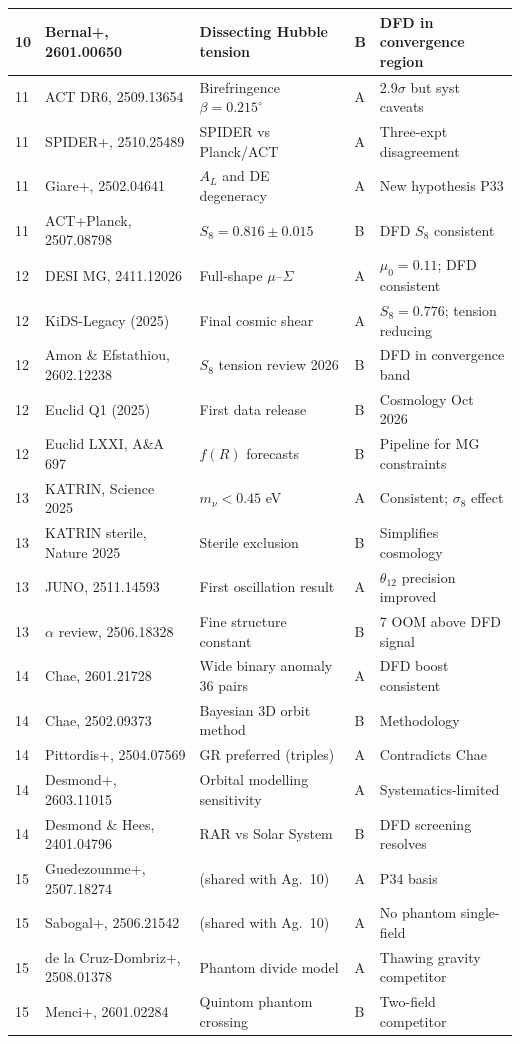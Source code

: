 \documentclass[11pt,a4paper]{article}
\begin{document}
\begin{longtable}{p{0.5cm}p{3.5cm}p{3.5cm}p{1cm}p{3.5cm}}
10 & Bernal+, 2601.00650 & Dissecting Hubble tension & B & DFD in convergence region \\
\midrule
11 & ACT DR6, 2509.13654 & Birefringence $\beta = 0.215^\circ$ & A & 2.9$\sigma$ but syst caveats \\
11 & SPIDER+, 2510.25489 & SPIDER vs Planck/ACT & A & Three-expt disagreement \\
11 & Giare+, 2502.04641 & $A_L$ and DE degeneracy & A & New hypothesis P33 \\
11 & ACT+Planck, 2507.08798 & $S_8 = 0.816 \pm 0.015$ & B & DFD $S_8$ consistent \\
\midrule
12 & DESI MG, 2411.12026 & Full-shape $\mu$--$\Sigma$ & A & $\mu_0 = 0.11$; DFD consistent \\
12 & KiDS-Legacy (2025) & Final cosmic shear & A & $S_8 = 0.776$; tension reducing \\
12 & Amon \& Efstathiou, 2602.12238 & $S_8$ tension review 2026 & B & DFD in convergence band \\
12 & Euclid Q1 (2025) & First data release & B & Cosmology Oct 2026 \\
12 & Euclid LXXI, A\&A 697 & $f(R)$ forecasts & B & Pipeline for MG constraints \\
\midrule
13 & KATRIN, Science 2025 & $m_\nu < 0.45$ eV & A & Consistent; $\sigma_8$ effect \\
13 & KATRIN sterile, Nature 2025 & Sterile exclusion & B & Simplifies cosmology \\
13 & JUNO, 2511.14593 & First oscillation result & A & $\theta_{12}$ precision improved \\
13 & $\alpha$ review, 2506.18328 & Fine structure constant & B & 7 OOM above DFD signal \\
\midrule
14 & Chae, 2601.21728 & Wide binary anomaly 36 pairs & A & DFD boost consistent \\
14 & Chae, 2502.09373 & Bayesian 3D orbit method & B & Methodology \\
14 & Pittordis+, 2504.07569 & GR preferred (triples) & A & Contradicts Chae \\
14 & Desmond+, 2603.11015 & Orbital modelling sensitivity & A & Systematics-limited \\
14 & Desmond \& Hees, 2401.04796 & RAR vs Solar System & B & DFD screening resolves \\
\midrule
15 & Guedezounme+, 2507.18274 & (shared with Ag.\ 10) & A & P34 basis \\
15 & Sabogal+, 2506.21542 & (shared with Ag.\ 10) & A & No phantom single-field \\
15 & de la Cruz-Dombriz+, 2508.01378 & Phantom divide model & A & Thawing gravity competitor \\
15 & Menci+, 2601.02284 & Quintom phantom crossing & B & Two-field competitor \\
\bottomrule
\end{longtable}
\end{document}
